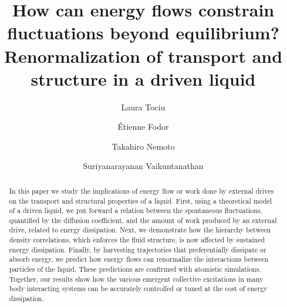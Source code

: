 \documentclass[pre, superscriptaddress, twocolumn,pre]{revtex4-1}
\begin{document}
\title{How can energy flows constrain fluctuations beyond equilibrium?\\Renormalization of transport and structure in a driven liquid}

\author{Laura Tociu}

\author{\'Etienne Fodor}

\author{Takahiro Nemoto}

\author{Suriyanarayanan Vaikuntanathan}

\begin{abstract}

In this paper we study the implications of energy flow or work done by external drives on the transport and structural properties of a liquid. First, using a theoretical model of a driven liquid, we put forward a relation between the spontaneous fluctuations, quantified by the diffusion coefficient, and the amount of work produced by an external drive, related to energy dissipation. Next, we demonstrate how the hierarchy between density correlations, which enforces the fluid structure, is now affected by sustained energy dissipation. Finally, by harvesting trajectories that preferentially dissipate or absorb energy, we predict how energy flows can renormalize the interactions between particles of the liquid. These predictions are confirmed with atomistic simulations. Together, our results show how the various emergent collective excitations in many body interacting systems can be accurately controlled or tuned at the cost of energy dissipation. 

\end{abstract}

\maketitle 


\end{document}

